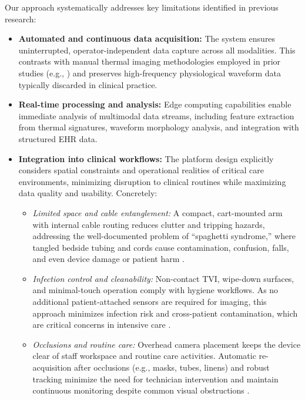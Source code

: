 Our approach systematically addresses key limitations identified in previous research:

\begin{itemize}
  \item \textbf{Automated and continuous data acquisition:} The system ensures uninterrupted, operator-independent data capture across all modalities. This contrasts with manual thermal imaging methodologies employed in prior studies (e.g., \citep{predicting_shock_from_thermal_images}) and preserves high-frequency physiological waveform data typically discarded in clinical practice.
  \item \textbf{Real-time processing and analysis:} Edge computing capabilities enable immediate analysis of multimodal data streams, including feature extraction from thermal signatures, waveform morphology analysis, and integration with structured EHR data.

  \item \textbf{Integration into clinical workflows:} The platform design explicitly considers spatial constraints and operational realities of critical care environments, minimizing disruption to clinical routines while maximizing data quality and usability. Concretely:
        \begin{itemize}
          \item \textit{Limited space and cable entanglement:} A compact, cart-mounted arm with internal cable routing reduces clutter and tripping hazards, addressing the well-documented problem of “spaghetti syndrome,” where tangled bedside tubing and cords cause contamination, confusion, falls, and even device damage or patient harm \citep{haynes2015managing}.

          \item \textit{Infection control and cleanability:} Non-contact TVI, wipe-down surfaces, and minimal-touch operation comply with hygiene workflows. As no additional patient-attached sensors are required for imaging, this approach minimizes infection risk and cross-patient contamination, which are critical concerns in intensive care \citep{choo2024application}.

          \item \textit{Occlusions and routine care:} Overhead camera placement keeps the device clear of staff workspace and routine care activities. Automatic re-acquisition after occlusions (e.g., masks, tubes, linens) and robust tracking minimize the need for technician intervention and maintain continuous monitoring despite common visual obstructions \citep{huang2023challenges}.


\end{itemize}
\end{itemize}
